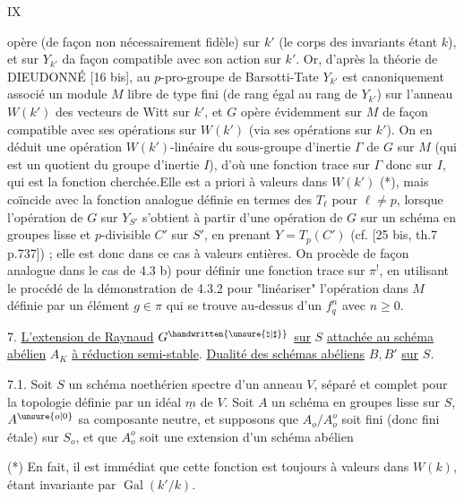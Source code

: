 \hfill IX

opère (de façon non nécessairement fidèle) sur $k'$ (le corps des invariants étant $k$), et sur $Y_{k'}$ da façon compatible avec son action sur $k'$. Or, d'après la théorie de DIEUDONNÉ [16 bis], au $p$-pro-groupe de Barsotti-Tate $Y_{k'}$ est canoniquement associé un module $M$ libre de type fini (de rang égal au rang de $Y_{k'}$) sur l'anneau $W(k')$ des vecteurs de Witt sur $k'$, et $G$ opère évidemment sur $M$ de façon compatible avec ses opérations sur $W(k')$ (via ses opérations sur $k'$). On en déduit une opération $W(k')$-linéaire du sous-groupe d'inertie $\Gamma$ de $G$ sur $M$ (qui est un quotient du groupe d'inertie $I$), d'où une fonction trace sur $\Gamma$ donc sur $I$, qui est la fonction cherchée.Elle est a priori à valeurs dans $W(k')$ (*), mais coïncide avec la fonction analogue définie en termes des $T_\ell$ pour $\ell\ne p$, lorsque l'opération de $G$ sur $Y_{S'}$ s'obtient à partir d'une opération de $G$ sur un schéma en groupes lisse et $p$-divisible $C'$ sur $S'$, en prenant $Y=T_p(C')$ (cf. [25 bis, th.7 p.737]) ; elle est donc dans ce cas à valeurs entières. On procède de façon analogue dans le cas de 4.3 b) pour définir une fonction trace sur $\pi^!$, en utilisant le procédé de la démonstration de 4.3.2 pour "linéariser" l'opération dans $M$ définie par un élément $g\in\pi$ qui se trouve au-dessus d'un $f_q^n$ avec $n\geq0$.

7. \uline{L'extension de Raynaud} $G^{\handwritten{\unsure{\natural|\sharp}}}$ \uline{sur} $S$ \uline{attachée au schéma abélien} $A_K$ \uline{à réduction semi-stable}. \uline{Dualité des schémas abéliens} $B,B'$ \uline{sur} $S$.

7.1. Soit $S$ un schéma noethérien spectre d'un anneau $V$, séparé et complet pour la topologie définie par un idéal $\underline m$ de $V$. Soit $A$ un schéma en groupes lisse sur $S$, $A^{\unsure{o|0}}$ sa composante neutre, et supposons que $A_o/A_o^o$ soit fini (donc fini étale) sur $S_o$, et que $A_o^o$ soit une extension d'un schéma abélien

\noindent (*) En fait, il est immédiat que cette fonction est toujours à valeurs dans $W(k)$, étant invariante par $\operatorname{Gal}(k'/k)$.

